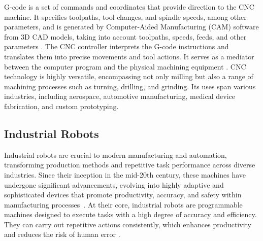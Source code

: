 \documentclass[ZLstudentexpose%
              ,optBiber%
              ,optEnglish%
              ,10pt
              ]{ZLlatex}%
\begin{document}
G-code is a set of commands and coordinates that provide direction to the CNC machine. It specifies toolpaths, tool changes, and spindle speeds, among other parameters, and is generated by Computer-Aided Manufacturing (CAM) software from 3D CAD models, taking into account toolpaths, speeds, feeds, and other parameters \cite{cnckonw}.
The CNC controller interprets the G-code instructions and translates them into precise movements and tool actions. It serves as a mediator between the computer program and the physical machining equipment \cite{Adam.2022}. CNC technology is highly versatile, encompassing not only milling but also a range of machining processes such as turning, drilling, and grinding. Its uses span various industries, including aerospace, automotive manufacturing, medical device fabrication, and custom prototyping.%
\subsection{Industrial Robots}
Industrial robots are crucial to modern manufacturing and automation, transforming production methods and repetitive task performance across diverse industries. Since their inception in the mid-20th century, these machines have undergone significant advancements, evolving into highly adaptive and sophisticated devices that promote productivity, accuracy, and safety within manufacturing processes~\cite{Ji.2019}.
At their core, industrial robots are programmable machines designed to execute tasks with a high degree of accuracy and efficiency. They can carry out repetitive actions consistently, which enhances productivity and reduces the risk of human error \cite{Siciliano.2016}. 
\end{document}
